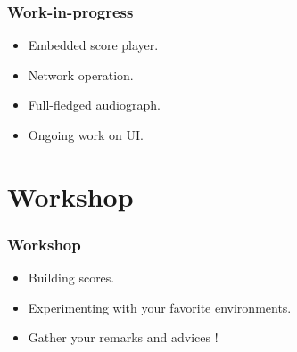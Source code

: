 \documentclass[handout]{beamer}
\begin{document}
\begin{frame}
\frametitle{Work-in-progress}
\Large
\begin{itemize}
    \item<1> Embedded score player.
    \item<2> Network operation.
    \item<3> Full-fledged audiograph.
    \item<4> Ongoing work on UI.
\end{itemize}
\end{frame}

\section{Workshop}

\begin{frame}
\frametitle{Workshop}
\Large
\begin{itemize}
    \item Building scores.
    \item Experimenting with your favorite environments.
    \item Gather your remarks and advices !
\end{itemize}
\end{frame}
\end{document}
